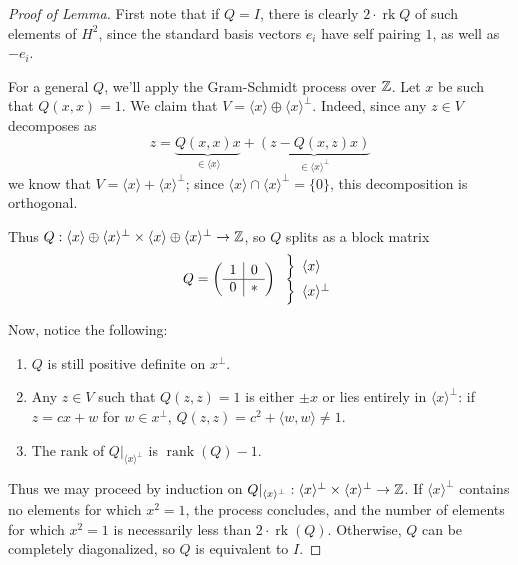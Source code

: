 \documentclass[main]{subfiles}
\begin{document}
\begin{proof}[Proof of Lemma]
First note that if $Q=I$, there is clearly $2\cdot\operatorname{rk} Q$ of such elements of $H^2$, since the standard basis vectors $e_i$ have self pairing $1$, as well as $-e_i$.

For a general $Q$, we'll apply the Gram-Schmidt process over $\mathbb Z$. Let $x$ be such that $Q(x,x)=1$. We claim that $V = \langle x\rangle \oplus \langle x\rangle^\perp$. Indeed, since any $z\in V$ decomposes as
\[
z = \underbrace{Q(x,x)x}_{\in\langle x\rangle} + \underbrace{(z-Q(x,z)x)}_{\in\langle x\rangle^\perp}
\]
we know that $V = \langle x\rangle + \langle x\rangle^\perp$; since $\langle x\rangle \cap \langle x\rangle^\perp = \{0\}$, this decomposition is orthogonal.

Thus $Q : \langle x\rangle\oplus\langle x\rangle^\perp \times \langle x\rangle\oplus\langle x\rangle^\perp \to \mathbb Z$, so $Q$ splits as a block matrix
\[
Q = \left(\begin{array}{c|c} 1 & 0 \\ \hline 0 & \ast \end{array}\right)
\begin{array}{l} \left.\rule{0pt}{1.1em}\right\}\ \langle x\rangle \\ \left.\rule{0pt}{1.1em}\right\}\ \langle x\rangle^\perp \end{array}
\]

Now, notice the following:
\begin{enumerate}
	\item $Q$ is still positive definite on $x^\perp$.
	\item Any $z\in V$ such that $Q(z,z)=1$ is either $\pm x$ or lies entirely in $\langle x\rangle^\perp$: if $z = cx+w$ for $w\in x^\perp$, $Q(z,z) = c^2 + \langle w,w\rangle \neq 1$.
	\item The rank of $Q|_{\langle x\rangle^\perp}$ is $\operatorname{rank}(Q)-1$.
\end{enumerate}

Thus we may proceed by induction on $Q|_{\langle x\rangle^\perp} : \langle x\rangle^\perp \times \langle x\rangle^\perp \to \mathbb Z$. If $\langle x\rangle^\perp$ contains no elements for which $x^2=1$, the process concludes, and the number of elements for which $x^2=1$ is necessarily less than $2\cdot\operatorname{rk}(Q)$. Otherwise, $Q$ can be completely diagonalized, so $Q$ is equivalent to $I$. \qedhere
\end{proof}
\end{document}
